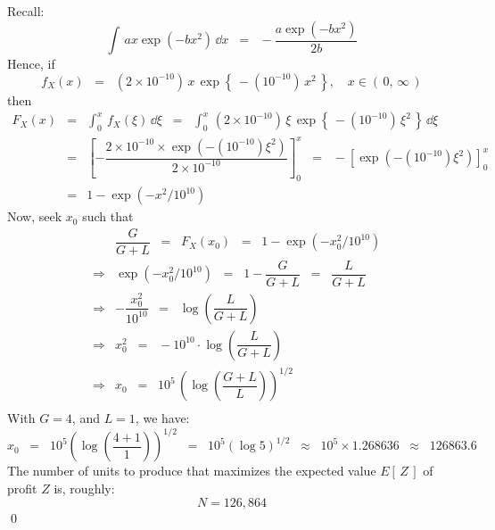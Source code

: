 \vskip 0.5cm
\noindent
Recall:
\begin{equation*}
\int\,a x \exp\left(-b x^{2} \right)\,\dd x
\;\;=\;\;
-\dfrac{a \exp\left(-b x^{2}\right)}{2b}
\end{equation*}
Hence, if
\begin{equation*}
f_{X}(x)
\;\;=\;\;
\left(2 \times 10^{-10}\right)\,x\,\exp\left\{\,-\left(10^{-10}\right)\,x^{2}\,\right\},
\quad x \in (\,0,\,\infty\,)
\end{equation*}
then
\begin{eqnarray*}
F_{X}(x)
&=& \int_{0}^{x}\,f_{X}(\xi)\,\dd\xi
\;\;=\;\; \int_{0}^{x}\,
\left(2 \times 10^{-10}\right)\,\xi\,\exp\left\{\,-\left(10^{-10}\right)\,\xi^{2}\,\right\}
\,\dd\xi \\
&=&
\left[
-\dfrac{2 \times 10^{-10} \times \exp\left(-\left(10^{-10}\right)\xi^{2}\right)}{2 \times 10^{-10}}
\right]_{0}^{x}
\;\;=\;\;
- \left[ \exp\left(-\left(10^{-10}\right)\xi^{2}\right) \right]_{0}^{x} \\
&=&
1 - \exp\left(-x^{2}/10^{10}\right)
\end{eqnarray*}
Now, seek $x_{0}$ such that
\begin{eqnarray*}
&&
\dfrac{G}{G+L} \;\; = \;\; F_{X}(x_{0}) \;\; = \;\; 1 - \exp\left(-x_{0}^{2}/10^{10}\right)
\\
&\Longrightarrow&
\exp\left(-x_{0}^{2}/10^{10}\right) \;\;=\;\; 1 - \dfrac{G}{G+L} \;\;=\;\; \dfrac{L}{G+L}
\\
&\Longrightarrow&
-\dfrac{x_{0}^{2}}{10^{10}} \;\;=\;\; \log\left(\dfrac{L}{G+L}\right)
\\
&\Longrightarrow&
x_{0}^{2} \;\;=\;\; - 10^{10}\cdot\log\left(\dfrac{L}{G+L}\right)
\\
&\Longrightarrow&
x_{0} \;\;=\;\; 10^{5}\,\left(\log\left(\dfrac{G+L}{L}\right)\right)^{1/2}
\\
\end{eqnarray*}
With $G = 4$, and $L = 1$, we have:
\begin{equation*}
x_{0}
\;\; = \;\;
10^{5} \left(\log\left(\dfrac{4+1}{1}\right)\right)^{1/2}
\;\; = \;\;       10^{5} \left(\log 5\right)^{1/2}
\;\; \approx \;\; 10^{5} \times 1.268636
\;\; \approx \;\; 126863.6
\end{equation*}
The number of units to produce that maximizes the expected value
$E[\,Z\,]$ of profit $Z$ is, roughly:
\begin{equation*}
N = 126,864
\end{equation*}
\qed

